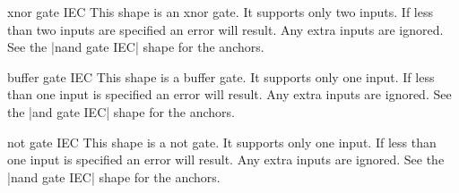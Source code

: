 \begin{shape}{xnor gate IEC}
  This shape is an xnor gate. It supports only two inputs.
  If less than two inputs are specified an error will result.
  Any extra inputs are ignored.  
	See the |nand gate IEC| shape for the anchors.
	
\begin{codeexample}[]
\end{codeexample}

\end{shape}

\begin{shape}{buffer gate IEC}
   This shape is a buffer gate. It supports only one input.
  If less than one input is specified an error will result.
  Any extra inputs are ignored. 
	See the |and gate IEC| shape for the anchors.

\begin{codeexample}[]
\end{codeexample}

\end{shape}


\begin{shape}{not gate IEC}
  This shape is a not gate. It supports only one input.
  If less than one input is specified an error will result.
  Any extra inputs are ignored. 
  See the |nand gate IEC| shape for the anchors.

\begin{codeexample}[]
\end{codeexample}


\end{shape}






